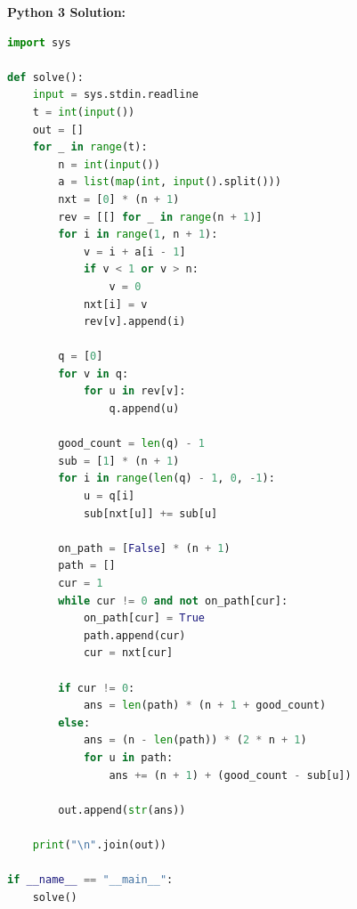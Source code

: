 \documentclass[11pt]{article}
\begin{document}
\textbf{Python 3 Solution:}
\begin{lstlisting}[language=Python]
import sys

def solve():
    input = sys.stdin.readline
    t = int(input())
    out = []
    for _ in range(t):
        n = int(input())
        a = list(map(int, input().split()))
        nxt = [0] * (n + 1)
        rev = [[] for _ in range(n + 1)]
        for i in range(1, n + 1):
            v = i + a[i - 1]
            if v < 1 or v > n:
                v = 0
            nxt[i] = v
            rev[v].append(i)

        q = [0]
        for v in q:
            for u in rev[v]:
                q.append(u)

        good_count = len(q) - 1
        sub = [1] * (n + 1)
        for i in range(len(q) - 1, 0, -1):
            u = q[i]
            sub[nxt[u]] += sub[u]

        on_path = [False] * (n + 1)
        path = []
        cur = 1
        while cur != 0 and not on_path[cur]:
            on_path[cur] = True
            path.append(cur)
            cur = nxt[cur]

        if cur != 0:
            ans = len(path) * (n + 1 + good_count)
        else:
            ans = (n - len(path)) * (2 * n + 1)
            for u in path:
                ans += (n + 1) + (good_count - sub[u])

        out.append(str(ans))

    print("\n".join(out))

if __name__ == "__main__":
    solve()
\end{lstlisting}
\end{document}

